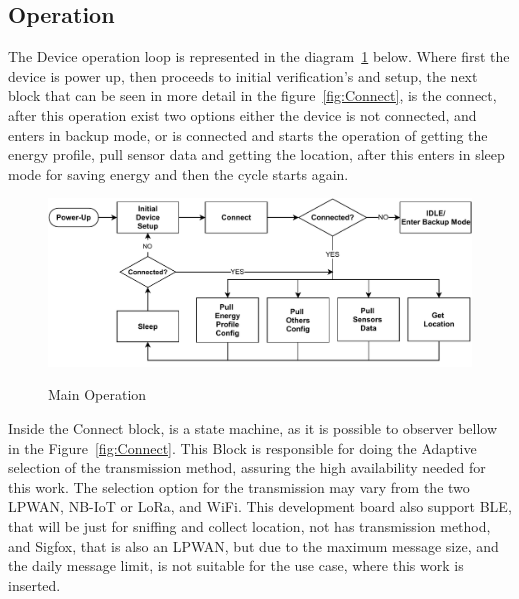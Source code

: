 \subsection{Operation}
\label{susec:Operation}
The Device operation loop is represented in the diagram~\ref{fig:Main_Op} below. Where first the device is power up, then proceeds to initial verification's and setup, the next block that can be seen in more detail in the figure~\ref{fig:Connect}, is the connect, after this operation exist two options either the device is not connected, and enters in backup mode, or is connected and starts the operation of getting the energy profile, pull sensor data and getting the location, after this enters in sleep mode for saving energy and then the cycle starts again.

\begin{figure}[htbp]
  \centering
  
    {\includegraphics[width=0.8\linewidth]{Chapters/Figures/Main.pdf}}%
 
  \caption{Main Operation}
  \label{fig:Main_Op}
\end{figure}

Inside the Connect block, is a state machine, as it is possible to observer bellow in the Figure~\ref{fig:Connect}. This Block is responsible for doing the Adaptive selection of the transmission method, assuring the high availability needed for this work. The selection option for the transmission may vary from the two LPWAN, NB-IoT or LoRa, and WiFi. This development board also support BLE, that will be just for sniffing and collect location, not has transmission method, and Sigfox, that is also an LPWAN, but due to the maximum message size, and the daily message limit, is not suitable for the use case, where this work is inserted.


